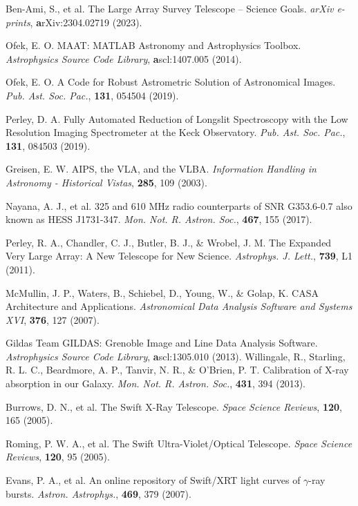 \documentclass{nature_plusfigure}
\newcommand{\mn}{{Mon. Not. R. Astron. Soc.}}
\newcommand{\mnras}{\mn}
\newcommand{\apjl}{{Astrophys. J. Lett.}}
\newcommand{\aap}{{Astron. Astrophys.}}
\newcommand{\pasp}{{Pub. Ast. Soc. Pac.}}
\newcommand{\ssr}{Space Science Reviews}
\begin{document}
\begin{methods}
\begin{thebibliography}{10}
 Ben-Ami, S., et al. The Large Array Survey Telescope -- Science Goals. \emph{arXiv e-prints}, \textbf arXiv:2304.02719 (2023). 

 Ofek, E. O. MAAT: MATLAB Astronomy and Astrophysics Toolbox. \emph{Astrophysics Source Code Library}, \textbf ascl:1407.005 (2014). 

 Ofek, E. O. A Code for Robust Astrometric Solution of Astronomical Images. \emph{\pasp}, \textbf{131}, 054504 (2019). 

 Perley, D. A. Fully Automated Reduction of Longslit Spectroscopy with the Low Resolution Imaging Spectrometer at the Keck Observatory. \emph{\pasp}, \textbf{131}, 084503 (2019). 


  Greisen, E. W. AIPS, the VLA, and the VLBA. \emph{Information Handling in Astronomy - Historical Vistas}, \textbf{285}, 109 (2003). 

 Nayana, A. J., et al. 325 and 610 MHz radio counterparts of SNR G353.6-0.7 also known as HESS J1731-347. \emph{\mnras}, \textbf{467}, 155 (2017). 

 Perley, R. A., Chandler, C. J., Butler, B. J., \& Wrobel, J. M. The Expanded Very Large Array: A New Telescope for New Science. \emph{\apjl}, \textbf{739}, L1 (2011). 

 McMullin, J. P., Waters, B., Schiebel, D., Young, W., \& Golap, K. CASA Architecture and Applications. \emph{Astronomical Data Analysis Software and Systems XVI}, \textbf{376}, 127 (2007). 

 Gildas Team GILDAS: Grenoble Image and Line Data Analysis Software. \emph{Astrophysics Source Code Library}, \textbf ascl:1305.010 (2013). 
 Willingale, R., Starling, R. L. C., Beardmore, A. P., Tanvir, N. R., \& O'Brien, P. T. Calibration of X-ray absorption in our Galaxy. \emph{\mnras}, \textbf{431}, 394 (2013). 


 Burrows, D. N., et al. The Swift X-Ray Telescope. \emph{\ssr}, \textbf{120}, 165 (2005). 

 Roming, P. W. A., et al. The Swift Ultra-Violet/Optical Telescope. \emph{\ssr}, \textbf{120}, 95 (2005).

 Evans, P. A., et al. An online repository of Swift/XRT light curves of $\gamma$-ray bursts. \emph{\aap}, \textbf{469}, 379 (2007). 


\end{thebibliography}
\end{methods}
\end{document}
